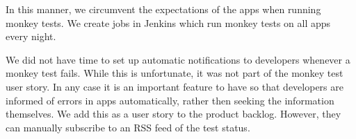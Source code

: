 In this manner, we circumvent the expectations of the apps when running monkey tests. We create jobs in Jenkins which run monkey tests on all apps every night.

We did not have time to set up automatic notifications to developers whenever a monkey test fails. While this is unfortunate, it was not part of the monkey test user story. In any case it is an important feature to have so that developers are informed of errors in apps automatically, rather then seeking the information themselves. We add this as a user story to the product backlog. However, they can manually subscribe to an RSS feed of the test status.